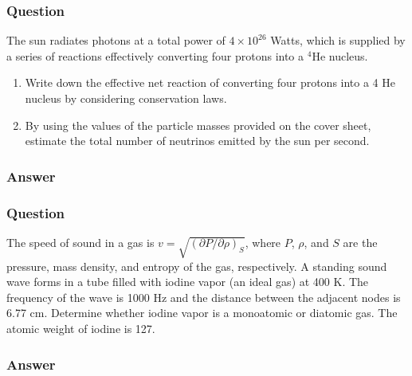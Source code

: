 \subsubsection{Question}
The sun radiates photons at a total power of $4\times10^26$ Watts, which is supplied by a series of reactions effectively converting four protons into a ${}^4$He nucleus.
\begin{enumerate}
	\item Write down the effective net reaction of converting four protons into a 4 He nucleus by considering conservation laws.
	\item By using the values of the particle masses provided on the cover sheet, estimate the total number of neutrinos emitted by the sun per second.
\end{enumerate}
\subsubsection{Answer}



\subsubsection{Question}
The speed of sound in a gas is $v = \sqrt{(\partial P/\partial \rho)_S}$, where $P$, $\rho$, and $S$ are the pressure, mass density, and entropy of the gas, respectively. A standing sound wave forms in a tube filled with iodine vapor (an ideal gas) at 400 K. The frequency of the wave is 1000 Hz and the distance between the adjacent nodes is 6.77 cm. Determine whether iodine vapor is a monoatomic or diatomic gas. The atomic weight of iodine is 127.
\subsubsection{Answer}




